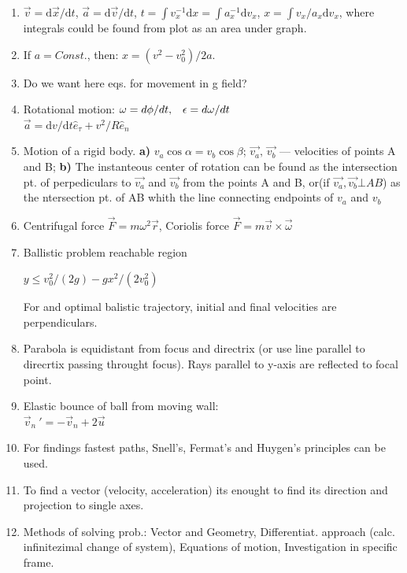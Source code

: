 \documentclass{article}
\renewcommand\d{\mathrm d}
\begin{document}
\begin{multicols}{3}

    \begin{enumerate}
        \item $\vec v=\d\vec x/\d t$, $\vec a=\d\vec v/\d t$, $t=\int v_x^{-1}\d x=\int a_x^{-1}\d v_x$, $x=\int v_x/a_x\d v_x$, where integrals could be found from plot as an area under graph.
        \item If $a=Const.$, then: $x=(v^2-v_0^2)/2a$.
        \item {\color{red} Do we want here eqs. for movement in g field?}
        \item Rotational motion: $\omega=d\phi/dt\text,\quad\epsilon=d\omega/dt$\\$\vec a=\d v/\d t\hat{e}_\tau+v^2/R\hat{e}_n$
        \item Motion of a rigid body. \textbf{a)} $v_a\cos\alpha=v_b\cos\beta$; $\vec{v_a}\text{, }\vec{v_b}$ --- velocities of points A and B;
            \textbf{b)} The instanteous center of rotation can be found as the intersection pt. of perpediculars to $\vec{v_a}$ and $\vec{v_b}$ from the points A and B, or(if $\vec{v_a}, \vec{v_b}\bot AB$) as the ntersection pt. of AB whith the line connecting endpoints of $v_a$ and $v_b$
        \item Centrifugal force $\vec F=m\omega^2\vec r$, Coriolis force $\vec{F} = m\vec{v}\times\vec{\omega}$
        \item Ballistic problem reachable region \par
            $y\leq v_0^2/(2g)-gx^2/(2v_0^2)$\par
            For and optimal balistic trajectory, initial and final velocities are perpendiculars.
        \item Parabola is equidistant from focus and directrix (or use line parallel to direcrtix passing throught focus). Rays parallel to y-axis are reflected to focal point.
        \item Elastic bounce of ball from moving wall:\\
            $\vec v_n\:'=-\vec v_n+2\vec u$
        \item For findings fastest paths, Snell's, Fermat's and Huygen's principles can be used.
        \item To find a vector (velocity, acceleration) its enought to find its direction and projection to single axes.
        \item Methods of solving prob.: Vector and Geometry, Differentiat. approach (calc. infinitezimal change of system), Equations of motion, Investigation in specific frame.
    \end{enumerate}
    ~\\~\\~\\


\end{multicols}
\end{document}
